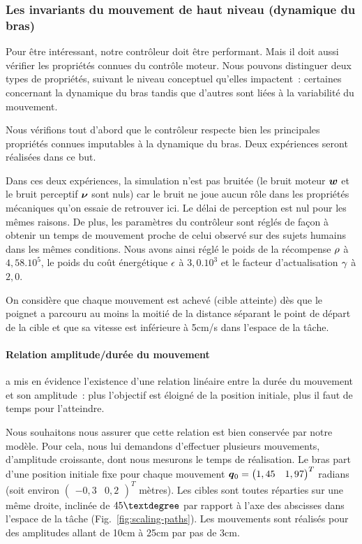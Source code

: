 \documentclass[pdftex,a4paper,11pt]{article}
\begin{document}

\subsubsection{Les invariants du mouvement de haut niveau (dynamique du bras)}

Pour être intéressant, notre contrôleur doit être performant. Mais il doit
aussi vérifier les propriétés connues du contrôle moteur.
Nous pouvons distinguer deux types de propriétés, suivant le niveau
conceptuel qu'elles impactent~: certaines concernant la dynamique du bras
tandis que d'autres sont liées à la variabilité du mouvement.

Nous vérifions tout d'abord que le contrôleur respecte bien les principales
propriétés connues imputables à la dynamique du bras.
Deux expériences seront réalisées dans ce but.

Dans ces deux expériences, 
la simulation n'est pas bruitée (le bruit moteur $\boldsymbol{w}$ et le bruit perceptif
$\boldsymbol{\nu}$ sont nuls) car le bruit ne joue aucun rôle dans les propriétés
mécaniques qu'on essaie de retrouver ici.
Le délai de perception est nul pour les mêmes raisons.
De plus,
les paramètres du contrôleur sont réglés de façon à obtenir un temps de
mouvement proche de celui observé sur des sujets humains dans les mêmes
conditions.
Nous avons ainsi réglé le poids de la récompense $\rho$ à $4,58.10^5$, le
poids du coût énergétique $\epsilon$ à $3,0.10^3$ et le facteur d'actualisation
$\gamma$ à $2,0$.

On considère que chaque mouvement est achevé (cible atteinte) dès que le
poignet a parcouru au moins la moitié de la distance séparant le point de
départ de la cible et que sa vitesse est inférieure à 5cm/s dans
l'espace de la tâche.


\paragraph{Relation amplitude/durée du mouvement}

\cite{gordon94} a mis en évi\-dence l'existence d'une relation linéaire entre
la durée du mouvement et son amplitude~:
plus l'objectif est éloigné de la position initiale, plus il faut de temps pour
l'atteindre.

Nous souhaitons nous assurer que cette relation est bien conservée par notre
modèle.
Pour cela, nous lui demandons d'effectuer plusieurs mouvements,
d'amplitude croissante, dont nous mesurons le temps de réalisation.
Le bras part d'une position initiale fixe pour chaque mouvement $\boldsymbol{q}{}_0 =
\begin{pmatrix} 1,45 & 1,97 \end{pmatrix}^T$ radians (soit environ 
$\begin{pmatrix} -0,3 & 0,2 \end{pmatrix}^T$ mètres). Les cibles sont toutes
réparties sur une même droite, inclinée de $45\textdegree$ par rapport à l'axe
des abscisses dans l'espace de la tâche (Fig.~\ref{fig:scaling-paths}).
Les mouvements sont réalisés pour des amplitudes allant de 10cm à 25cm par pas de 3cm.
\end{document}
